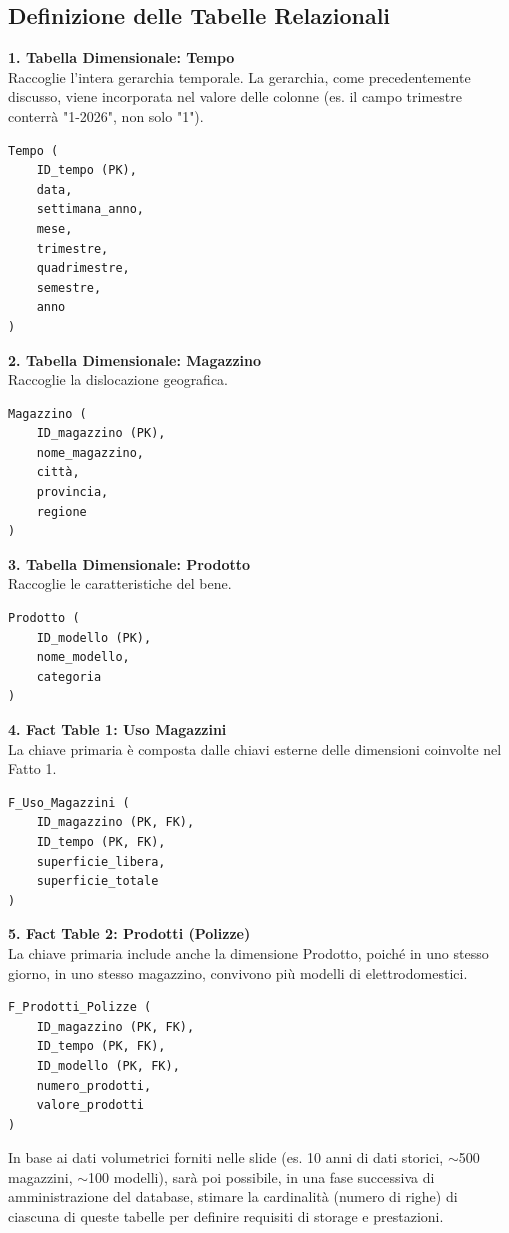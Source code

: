 \subsection{Definizione delle Tabelle Relazionali}

\textbf{1. Tabella Dimensionale: Tempo} \\
Raccoglie l'intera gerarchia temporale. La gerarchia, come precedentemente discusso, viene incorporata nel valore delle colonne (es. il campo trimestre conterrà "1-2026", non solo "1").
\begin{verbatim}
Tempo (
    ID_tempo (PK),
    data,
    settimana_anno,
    mese,
    trimestre,
    quadrimestre,
    semestre,
    anno
)
\end{verbatim}

\textbf{2. Tabella Dimensionale: Magazzino} \\
Raccoglie la dislocazione geografica.
\begin{verbatim}
Magazzino (
    ID_magazzino (PK),
    nome_magazzino,
    città,
    provincia,
    regione
)
\end{verbatim}

\textbf{3. Tabella Dimensionale: Prodotto} \\
Raccoglie le caratteristiche del bene.
\begin{verbatim}
Prodotto (
    ID_modello (PK),
    nome_modello,
    categoria
)
\end{verbatim}

\textbf{4. Fact Table 1: Uso Magazzini} \\
La chiave primaria è composta dalle chiavi esterne delle dimensioni coinvolte nel Fatto 1.
\begin{verbatim}
F_Uso_Magazzini (
    ID_magazzino (PK, FK),
    ID_tempo (PK, FK),
    superficie_libera,
    superficie_totale
)
\end{verbatim}

\textbf{5. Fact Table 2: Prodotti (Polizze)} \\
La chiave primaria include anche la dimensione Prodotto, poiché in uno stesso giorno, in uno stesso magazzino, convivono più modelli di elettrodomestici.
\begin{verbatim}
F_Prodotti_Polizze (
    ID_magazzino (PK, FK),
    ID_tempo (PK, FK),
    ID_modello (PK, FK),
    numero_prodotti,
    valore_prodotti
)
\end{verbatim}

In base ai dati volumetrici forniti nelle slide (es. 10 anni di dati storici, $\sim$500 magazzini, $\sim$100 modelli), sarà poi possibile, in una fase successiva di amministrazione del database, stimare la cardinalità (numero di righe) di ciascuna di queste tabelle per definire requisiti di storage e prestazioni.

